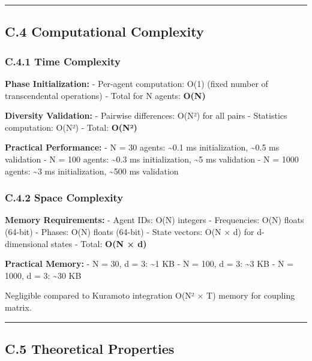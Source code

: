 \documentclass[
]{article}
\begin{document}
\begin{center}\rule{0.5\linewidth}{0.5pt}\end{center}

\subsection{C.4 Computational
Complexity}\label{c.4-computational-complexity}

\subsubsection{C.4.1 Time Complexity}\label{c.4.1-time-complexity}

\textbf{Phase Initialization:} - Per-agent computation: O(1) (fixed
number of transcendental operations) - Total for N agents: \textbf{O(N)}

\textbf{Diversity Validation:} - Pairwise differences: O(N²) for all
pairs - Statistics computation: O(N²) - Total: \textbf{O(N²)}

\textbf{Practical Performance:} - N = 30 agents: \textasciitilde0.1 ms
initialization, \textasciitilde0.5 ms validation - N = 100 agents:
\textasciitilde0.3 ms initialization, \textasciitilde5 ms validation - N
= 1000 agents: \textasciitilde3 ms initialization, \textasciitilde500 ms
validation

\subsubsection{C.4.2 Space Complexity}\label{c.4.2-space-complexity}

\textbf{Memory Requirements:} - Agent IDs: O(N) integers - Frequencies:
O(N) floats (64-bit) - Phases: O(N) floats (64-bit) - State vectors: O(N
× d) for d-dimensional states - Total: \textbf{O(N × d)}

\textbf{Practical Memory:} - N = 30, d = 3: \textasciitilde1 KB - N =
100, d = 3: \textasciitilde3 KB - N = 1000, d = 3: \textasciitilde30 KB

Negligible compared to Kuramoto integration O(N² × T) memory for
coupling matrix.

\begin{center}\rule{0.5\linewidth}{0.5pt}\end{center}

\subsection{C.5 Theoretical
Properties}\label{c.5-theoretical-properties}
\end{document}
